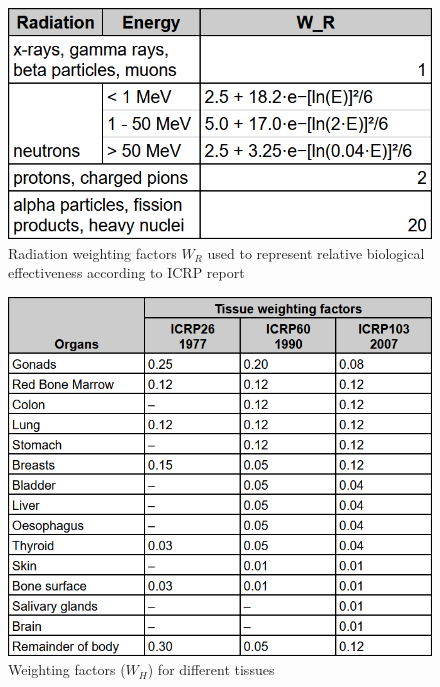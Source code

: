 \documentclass[12pt,a4paper]{report}
\begin{document}
\begin{figure}[hbtp]
\centering
\includegraphics[width=1\textwidth]{img/Wr.png}
\caption{Radiation weighting factors $W_R$ used to represent relative biological effectiveness according to ICRP report \citet{valentin20072007}}
\end{figure}

\begin{figure}[hbtp]
\centering
\includegraphics[width=1\textwidth]{img/Wh.png}
\caption{Weighting factors ($W_H$) for different tissues}
\end{figure}
\end{document}
